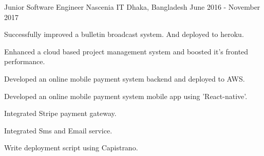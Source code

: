 \begin{cventries}
\cventry
    {Junior Software Engineer}
    {Nascenia IT}
    {Dhaka, Bangladesh}
    {June 2016 - November 2017}
    {
      \begin{cvitemsNumber}[Responsibilities:]
        \vspace{1mm}
        \item {Successfully improved a bulletin broadcast system. And deployed to heroku.}
        \vspace{1mm}
        \item {Enhanced a cloud based project management system and boosted it's fronted performance.}
        \vspace{1mm}
        \item {Developed an online mobile payment system backend and deployed to AWS.}
        \vspace{1mm}
        \item {Developed an online mobile payment system mobile app using 'React-native'.}
        \vspace{1mm}
        \item {Integrated Stripe payment gateway.}
        \vspace{1mm}
        \item {Integrated Sms and Email service.}
        \vspace{1mm}
        \item {Write deployment script using Capistrano.}
        \vspace{1mm}
      \end{cvitemsNumber}
    }
\end{cventries}
